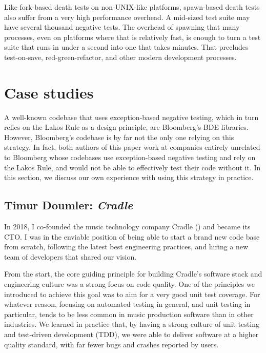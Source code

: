 Like fork-based death tests on non-UNIX-like platforms, spawn-based death tests also suffer from a very high performance overhead. A mid-sized test suite may have several thousand negative tests. The overhead of spawning that many processes, even on platforms where that is relatively fast, is enough to turn a test suite that runs in under a second into one that takes minutes. That precludes test-on-save, red-green-refactor, and other modern development processes.

\section{Case studies}
\label{sec:casestudies}

A well-known codebase that uses exception-based negative testing, which in turn relies on the Lakos Rule as a design principle, are Bloomberg's BDE libraries. However, Bloomberg's codebase is by far not the only one relying on this strategy. In fact, both authors of this paper work at companies entirely unrelated to Bloomberg whose codebases use exception-based negative testing and rely on the Lakos Rule, and would not be able to effectively test their code without it. In this section, we discuss our own experience with using this strategy in practice.

\subsection{Timur Doumler: \emph{Cradle}}

In 2018, I co-founded the music technology company Cradle (\hyperref[https://cradle.app]{}) and became its CTO. I was in the enviable position of being able to start a brand new code base from scratch, following the latest best engineering practices, and hiring a new team of developers that shared our vision.

From the start, the core guiding principle for building Cradle's software stack and engineering culture was a strong focus on code quality. One of the principles we introduced to achieve this goal was to aim for a very good unit test coverage. For whatever reason, focusing on automated testing in general, and unit testing in particular, tends to be less common in  music production software than in other industries. We learned in practice that, by having a strong culture of unit testing and test-driven development (TDD), we were able to deliver software at a higher quality standard, with far fewer bugs and crashes reported by users.

